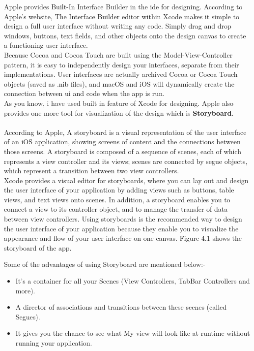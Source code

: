 
Apple provides Built-In Interface Builder in the \gls{ide} for designing.
According to Apple's website, The Interface Builder editor within Xcode makes it simple to design a full user interface without writing any code. Simply drag and drop windows, buttons, text fields, and other objects onto the design canvas to create a functioning user interface. \\

Because Cocoa and Cocoa Touch are built using the Model-View-Controller pattern, it is easy to independently design your interfaces, separate from their implementations. User interfaces are actually archived Cocoa or Cocoa Touch objects (saved as .nib files), and \gls{macOS} and \gls{iOS} will dynamically create the connection between \gls{ui} and code when the app is run. \\

As you know, i have used built in feature of Xcode for designing. Apple also provides one more tool for visualization of the design which is \textbf{Storyboard}. \\ \\
According to Apple, A storyboard is a visual representation of the user interface of an \gls{iOS} application, showing screens of content and the connections between those screens. A storyboard is composed of a sequence of scenes, each of which represents a view controller and its views; scenes are connected by segue objects, which represent a transition between two view controllers. \\

Xcode provides a visual editor for storyboards, where you can lay out and design the user interface of your application by adding views such as buttons, table views, and text views onto scenes. In addition, a storyboard enables you to connect a view to its controller object, and to manage the transfer of data between view controllers. Using storyboards is the recommended way to design the user interface of your application because they enable you to visualize the appearance and flow of your user interface on one canvas. Figure 4.1 shows the storyboard of the app. 

Some of the advantages of using Storyboard are mentioned below:-
\begin{itemize}
    \item It's a container for all your Scenes (View Controllers, TabBar Controllers and more).
    \item A director of associations and transitions between these scenes (called Segues).
    \item It gives you the chance to see what My view will look like at runtime without running your application.
\end{itemize}

